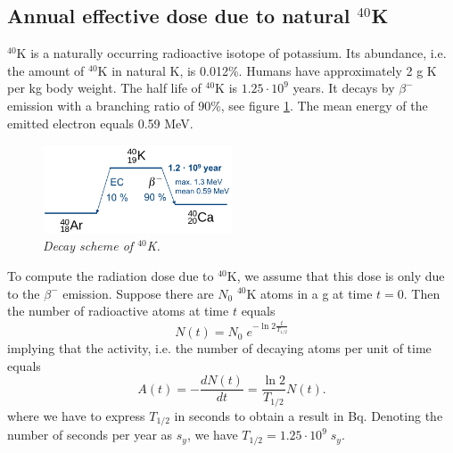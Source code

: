 \subsection{Annual effective dose due to natural $^{40}$K}
$^{40}$K is a naturally occurring radioactive isotope of potassium.
Its abundance, i.e. the amount of $^{40}$K in natural K, is 0.012\%.
Humans have approximately 2 g K per kg body weight. The half life of
$^{40}$K is $1.25 \cdot 10^9$ years. It decays by $\beta^-$ emission
with a branching ratio of 90\%, see figure \ref{fig:40Kdecay}. The
mean energy of the emitted electron equals 0.59 MeV.
\begin{figure}[htb]
  \includegraphics[width=0.5\textwidth]{figs/fig_40K_decay.png}
  \centering
  \caption{\label{fig:40Kdecay}
  \emph{Decay scheme of $^{40}$K.}}
\end{figure}

To compute the radiation dose due to $^{40}$K, we assume that this
dose is only due to the $\beta^-$ emission.  Suppose there are $N_0$
$^{40}$K atoms in a g at time $t = 0$. Then the number of radioactive
atoms at time $t$ equals
\begin{equation}
  N(t) = N_0 \; e^{- \ln 2 \frac{t}{T_{1/2}}}
\end{equation}
implying that the activity, i.e. the number of decaying atoms per unit of
time equals
\begin{equation}
  A(t) = - \frac{dN(t)}{dt} = \frac{\ln 2}{T_{1/2}} N(t).
\end{equation}
where we have to express $T_{1/2}$ in seconds to obtain a result in
Bq. Denoting the number of seconds per year as $s_y$, we have
$T_{1/2} = 1.25 \cdot 10^9 \; s_y$.

